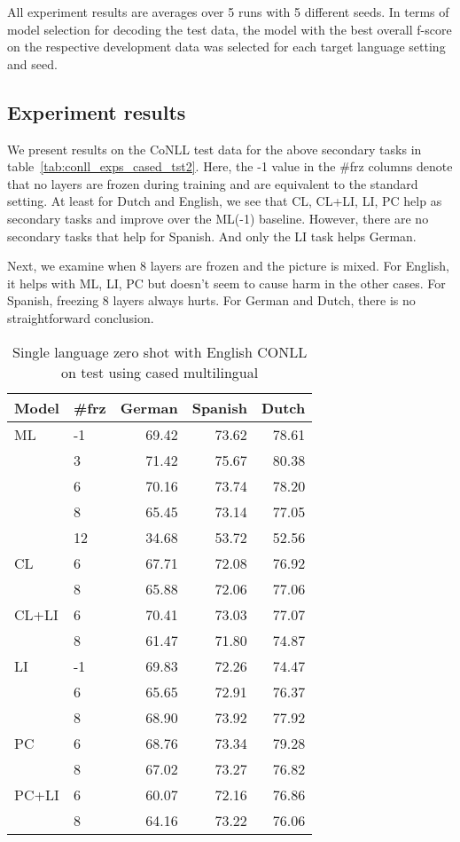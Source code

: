 \documentclass[letterpaper]{article} \usepackage{aaai20}  \usepackage{times}  \usepackage{helvet} \usepackage{courier}  \usepackage[hyphens]{url}  \usepackage{graphicx} \urlstyle{rm} \def\UrlFont{\rm}  \usepackage{graphicx}  \frenchspacing  \setlength{\pdfpagewidth}{8.5in}  \setlength{\pdfpageheight}{11in}  \usepackage{amsmath}
\begin{document}
All experiment results are averages over 5 runs with 5 different seeds. In terms of model selection for decoding the test data, the model with the best overall f-score on the respective development data was selected for each target language setting and seed.

\subsection{Experiment results}
We present results on the CoNLL test data for the above secondary tasks in table~\ref{tab:conll_exps_cased_tst2}. Here, the -1 value in the \#frz columns denote that no layers are frozen during training and are equivalent to the standard setting. At least for Dutch and English, we see that CL, CL+LI, LI, PC help as secondary tasks and improve over the ML(-1) baseline. However, there are no secondary tasks that help for Spanish. And only the LI task helps German. 

Next, we examine when 8 layers are frozen and the picture is mixed. For English, it helps with ML, LI, PC but doesn't seem to cause harm in the other cases. For Spanish, freezing 8 layers always hurts. For German and Dutch, there is no straightforward conclusion.

\begin{table}
\begin{center}
\begin{tabular}{llrrr}
\toprule
 Model     &  \#frz &   German &   Spanish &   Dutch \\
\midrule
ML & -1  & 69.42 & 73.62 & 78.61 \\
      &  3  & 71.42 & 75.67 & 80.38 \\ &  6  & 70.16 & 73.74 & 78.20 \\
      &  8  & 65.45 & 73.14 & 77.05 \\
      &  12 & 34.68 & 53.72 & 52.56 \\
CL &  6  & 67.71 & 72.08 & 76.92 \\
      &  8  & 65.88 & 72.06 & 77.06 \\
CL+LI &  6  & 70.41 & 73.03 & 77.07 \\
      &  8  & 61.47 & 71.80 & 74.87 \\
LI & -1  & 69.83 & 72.26 & 74.47 \\
      &  6  & 65.65 & 72.91 & 76.37 \\
      &  8  & 68.90 & 73.92 & 77.92 \\
PC &  6  & 68.76 & 73.34 & 79.28 \\
      &  8  & 67.02 & 73.27 & 76.82 \\
PC+LI &  6  & 60.07 & 72.16 & 76.86 \\
      &  8  & 64.16 & 73.22 & 76.06 \\
\bottomrule
\end{tabular}
\caption{Single language zero shot with English CONLL on test using cased multilingual}
\label{tab:conll_csd_sl_tst}
\end{center}
\end{table}
\end{document}
